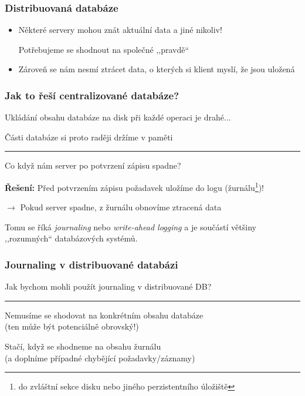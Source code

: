 \documentclass[usenames,dvipsnames,9pt]{beamer}
\begin{document}
\begin{frame}
  \frametitle{Distribuovaná databáze}

  {\large\bf
    \begin{itemize}
      \item[\faWarning] Některé servery mohou znát aktuální data a jiné nikoliv!

                        \hfill {\normalfont\Large Potřebujeme se shodnout na společné ,,pravdě``} \\[2em]

      \pause
      \item[\faWarning] Zároveň se nám nesmí ztrácet data, o kterých si klient myslí, že jsou uložená
    \end{itemize}
  }
\end{frame}

\begin{frame}
  \frametitle{Jak to řeší centralizované databáze?}

  {\large Ukládání obsahu databáze na disk při každé operaci je drahé...}

  \hfill {\large \faWarning \hspace{3pt} Části databáze si proto raději držíme v paměti}

  \pause\vspace{3em}\hrule\vspace{0.2em}
  \begin{center}
    \LARGE Co když nám server po potvrzení zápisu spadne?
  \end{center}

  \vspace{1em}\pause
  {\large
    \textbf{Řešení:} Před potvrzením zápisu požadavek uložíme do logu (žurnálu\footnote{do zvláštní sekce disku nebo jiného perzistentního úložiště})!

    \hspace{20pt} $\rightarrow$ Pokud server spadne, z žurnálu obnovíme ztracená data

    \vspace{1em}

    Tomu se říká \emph{journaling} nebo \emph{write-ahead logging} a je součástí většiny ,,rozumných`` databázových systémů.
  }
\end{frame}

\begin{frame}
  \frametitle{Journaling v distribuované databázi}
  \begin{center}
    \LARGE Jak bychom mohli použít journaling v distribuované DB?
  \end{center}

  \pause
  \vspace{2em}\hrule\vspace{2em}

  {\Large Nemusíme se shodovat na konkrétním obsahu databáze} \\
  (ten může být potenciálně obrovský!)

  \vspace{1em}

  {\Large Stačí, když se shodneme na obsahu žurnálu} \\
  (a doplníme případné chybějící požadavky/záznamy)
\end{frame}
\end{document}
